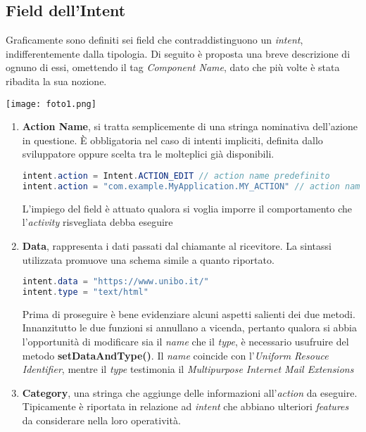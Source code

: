 \documentclass{article}
\begin{document}
\subsection*{Field dell'Intent}
Graficamente sono definiti sei field che contraddistinguono un \textit{intent}, indifferentemente dalla tipologia. Di seguito è proposta una breve descrizione di ognuno di essi, omettendo il tag \textit{Component Name}, dato che più volte è stata ribadita la sua nozione.\\
\begin{center}
    \texttt{[image: foto1.png]}
\end{center}
\begin{enumerate}
    \itemsep0em
    \renewcommand{\labelenumi}{ }
    \item \textbf{Action Name}, si tratta semplicemente di una stringa nominativa dell'azione in questione. È obbligatoria nel caso di intenti impliciti, definita dallo sviluppatore oppure scelta tra le molteplici già disponibili.
    \begin{lstlisting}[language=JAVA, title=Definizione del field action name]
intent.action = Intent.ACTION_EDIT // action name predefinito
intent.action = "com.example.MyApplication.MY_ACTION" // action name personalizzato
    \end{lstlisting}
    L'impiego del field è attuato qualora si voglia imporre il comportamento che l'\textit{activity} risvegliata debba eseguire
    \item \textbf{Data}, rappresenta i dati passati dal chiamante al ricevitore. La sintassi utilizzata promuove una schema simile a quanto riportato.
    \begin{lstlisting}[language=JAVA, title=Definizone del field data]
intent.data = "https://www.unibo.it/"
intent.type = "text/html"
    \end{lstlisting}
    Prima di proseguire è bene evidenziare alcuni aspetti salienti dei due metodi. Innanzitutto le due funzioni si annullano a vicenda, pertanto qualora si abbia l'opportunità di modificare sia il \textit{name} che il \textit{type}, è necessario usufruire del metodo \textbf{setDataAndType()}. Il \textit{name} coincide con l'\textit{Uniform Resouce Identifier}, mentre il \textit{type} testimonia il \textit{Multipurpose Internet Mail Extensions} 
    \item \textbf{Category}, una stringa che aggiunge delle informazioni all'\textit{action} da eseguire. Tipicamente è riportata in relazione ad \textit{intent} che abbiano ulteriori \textit{features} da considerare nella loro operatività.

\end{enumerate}
\end{document}
